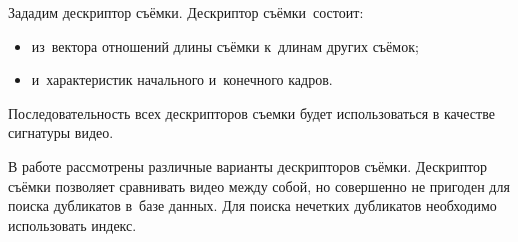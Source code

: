 \documentclass{.local/lib/classes/ndvr-super-article-standalone}
\begin{document}
    
    \noindent
    Зададим дескриптор съёмки.
    Дескриптор съёмки~состоит:
    \begin{itemize}
        \item из~вектора отношений длины съёмки 
            к~длинам других съёмок;
        \item и~характеристик начального и~конечного кадров.
    \end{itemize}
    Последовательность всех дескрипторов съемки
    будет использоваться в качестве сигнатуры видео.

    В работе рассмотрены различные варианты дескрипторов съёмки.
    Дескриптор съёмки позволяет сравнивать видео между собой,
    но совершенно не пригоден для поиска дубликатов 
    в~базе данных. Для поиска нечетких дубликатов необходимо  
    использовать индекс.
        
\end{document}
